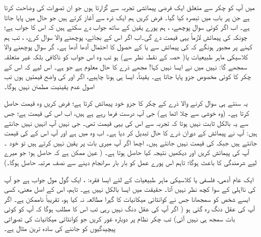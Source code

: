 میں آپ کو  چکر سے متعلق ایک فرضی پیمائشی تجربہ سے گزارتا ہوں جو ان تصورات کی وضاحت کرتا ہے جن پر باب  میں تبصرہ کیا گیا۔ فرض کریں ہم ایک ذرہ سے آغاز کرتے ہیں جو حال میں پایا جاتا ہے۔ اب اگر کوئی سوال پوچھے، ، ہم پورے یقین کے ساتھ جواب دے سکتے ہیں کہ اس کا جواب 
  ہے؛ چونکہ  کی پیمائش لازماً یہی قیمت دے گی۔اب اگر اس کے بجائے، پوچھنے والا سوال کرے، ، تب ہم کہنے پر مجبور ہونگے کہ  کی پیمائش سے  یا  کے حصول کا احتمال آدھا آدھا ہے۔ گر سوال پوچھنے والا کلاسیکی ماہر طبیعیات 
 یا( حصہ  کے نقطہ نظر سے)  ہو تب وہ اس جواب کو ناکافی بلکہ غیر متعلقہ سمجھے گا:  نہیں میں نے ایسا نہیں کہا! مجھے ذرے کا حال  معلوم ہے جو  ہے۔  اس لیے کہ اس کے چکر کا کوئی مخصوص  جزو  پایا جاتا ہے۔ یقیناً، ایسا ہی ہونا چاہیے، اگر  اور  کی واضح قیمتیں ہوں تب اصول عدم یقینیت مطمئن نہیں ہوگا۔
 
 یہ سنتے ہی سوال کرنے والا ذرے کے چکر کا  جزو خود پیمائش کرتا ہے؛ فرض کریں وہ  قیمت حاصل کرتا ہے۔ (وہ خوشی سے چلا اٹھا ہے)  جی آپ درست فرما رہے ہے ہیں، اب اس کی  قیمت ہے؛ جس سے یہ بالکل ثابت نہیں ہوتا کہ تجربہ سے  اس کی یہی قیمت تھی۔  جی نہیں آپ انہیں نہیں جانتے ہیں: آپ نے پیمائش کے دوران ذرے کا حال تبدیل کر دیا ہے۔ اب وہ  میں ہے اور آپ اس کے  کی قیمت جانتے ہیں جبکہ  کی قیمت نہیں جانتے ہیں۔ اچھا اگر آپ میری بات پر یقین نہیں کرتے ہیں تو خود ۔ آپ  کی پیمائش کریں اور دیکھیں نتیجہ کیا حاصل ہوتا ہے۔ ( عین ممکن ہے
 کہ  حاصل ہو؛ جو میرے لیے شرمندگی کا باعث ہوگا؛ تاہم اس پورے عمل کو بار بار سرانجام دینے سے نصف مرتبہ  حاصل ہوگا۔)
 
 ایک عام آدمی، فلسفی یا کلاسیکی ماہر طبیعیات کے لئے ایسا فقرہ: ، ایک گول مول جواب ہے جو آپ کی نااہلی کے سوا کچھ نظر نہیں آتا۔ حقیقت میں ایسا بالکل نہیں ہے۔ تاہم، اس کے اصل معنی، کسی ایسے شخص کو سمجھانا جس نے کوانٹائی میکانیات کا گہرا مطالعہ نہ کیا ہو، تقریباً ناممکن ہے۔ اگر آپ کی عقل دنگ رہ گئی ہو ( اگر آپ کی عقل دنگ نہیں رہی تب اس کا مطلب ہوگا کہ آپ کو کوئی بات سمجھ ہی نہیں آئی) تب  چکر نظام پر دوبارہ غور کریں جو کوانٹائی میکانیات کی تصوراتی پیچیدگیوں کو جاننے کی سادہ ترین مثال ہے۔


